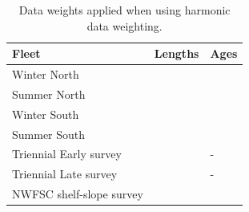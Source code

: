 \documentclass[12pt,]{article}
\begin{document}
\FloatBarrier

\begin{table}[ht]
\centering
\caption{Data weights applied when using harmonic data weighting.} 
\label{tab:harm}
\begin{tabular}{>{\raggedright}p{2in}>{\centering}p{.7in}>{\centering}p{.7in}}
  \hline
Fleet & Lengths & Ages \\ 
  \hline
Winter North &  &  \\ 
  Summer North &  &  \\ 
  Winter South &  &  \\ 
  Summer South &  &  \\ 
  Triennial Early survey &  & - \\ 
  Triennial Late survey &  & - \\ 
  NWFSC shelf-slope survey &  &  \\ 
   \hline
\end{tabular}
\end{table}

\FloatBarrier 
\end{document}

